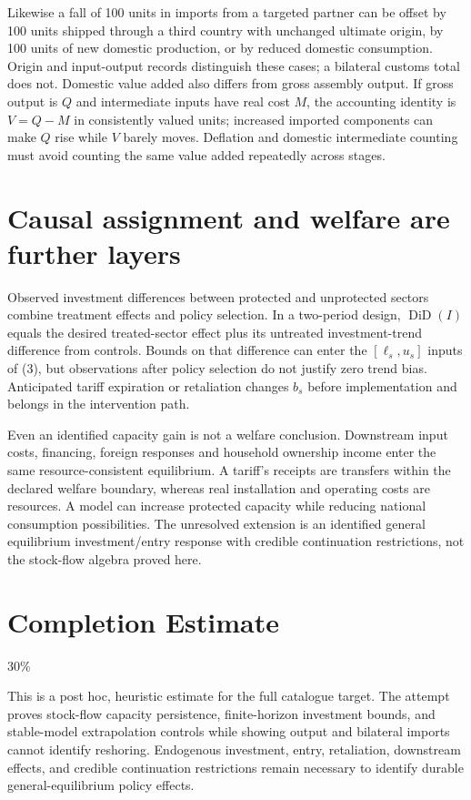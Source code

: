 \documentclass[11pt]{article}
\theoremstyle{definition}
\begin{document}
Likewise a fall of 100 units in imports from a targeted partner can be offset
by 100 units shipped through a third country with unchanged ultimate origin,
by 100 units of new domestic production, or by reduced domestic consumption.
Origin and input-output records distinguish these cases; a bilateral customs
total does not. Domestic value added also differs from gross assembly output.
If gross output is $Q$ and intermediate inputs have real cost $M$, the accounting
identity is $V=Q-M$ in consistently valued units; increased imported components
can make $Q$ rise while $V$ barely moves. Deflation and domestic intermediate
counting must avoid counting the same value added repeatedly across stages.

\section*{Causal assignment and welfare are further layers}
Observed investment differences between protected and unprotected sectors
combine treatment effects and policy selection. In a two-period design,
$\operatorname{DiD}(I)$ equals the desired treated-sector effect plus its
untreated investment-trend difference from controls. Bounds on that difference
can enter the $[\ell_s,u_s]$ inputs of (3), but observations after policy selection
do not justify zero trend bias. Anticipated tariff expiration or retaliation
changes $b_s$ before implementation and belongs in the intervention path.

Even an identified capacity gain is not a welfare conclusion. Downstream input
costs, financing, foreign responses and household ownership income enter the
same resource-consistent equilibrium. A tariff's receipts are transfers within
the declared welfare boundary, whereas real installation and operating costs
are resources. A model can increase protected capacity while reducing national
consumption possibilities. The unresolved extension is an identified general
equilibrium investment/entry response with credible continuation restrictions,
not the stock-flow algebra proved here.

\section{Completion Estimate}
30\%

This is a post hoc, heuristic estimate for the full catalogue target.
The attempt proves stock-flow capacity persistence, finite-horizon investment bounds, and stable-model extrapolation controls while showing output and bilateral imports cannot identify reshoring. Endogenous investment, entry, retaliation, downstream effects, and credible continuation restrictions remain necessary to identify durable general-equilibrium policy effects.
\end{document}
